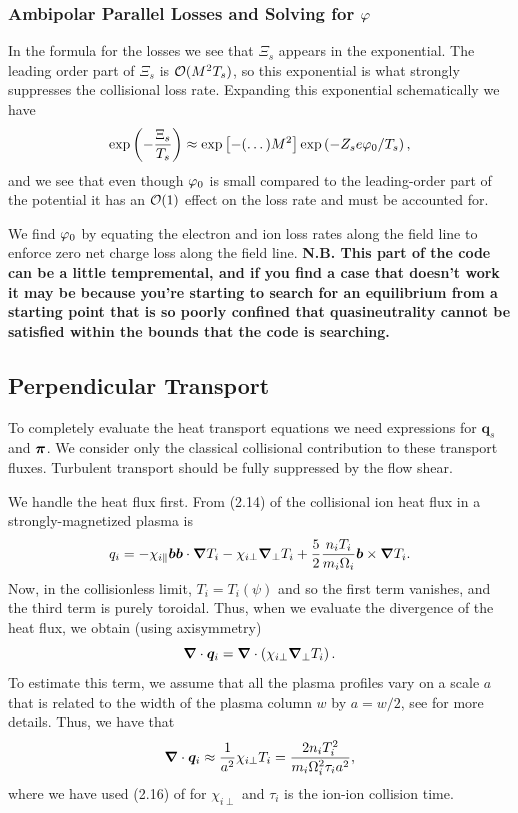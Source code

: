 \documentclass{revtex4}
\providecommand{\pitens}{\tensor{\pi}}
\begin{document}
\subsubsection{Ambipolar Parallel Losses and Solving for $\pot$}
In the formula  for the losses we see that $\Xi_s$ appears in the exponential. The leading order part of $\Xi_s$ is $\Or(M^2 T_s)$, so this exponential is what strongly suppresses the collisional loss rate. Expanding this exponential schematically we have
\begin{equation}
\exp\left( -\frac{\Xi_s}{T_s} \right) \approx \exp\left[ - (\dots) M^2 \right] \exp\left( -Z_s e \pot_0 / T_s \right),
\end{equation}
and we see that even though $\pot_0$ is small compared to the leading-order part of the potential it has an $\Or(1)$ effect on the loss rate and must be accounted for.

We find $\pot_0$ by equating the electron and ion loss rates along the field line to enforce zero net charge loss along the field line. \textbf{N.B. This part of the code can be a little tempremental, and if you find a case that doesn't work it may be because you're starting to search for an equilibrium from a starting point that is so poorly confined that quasineutrality cannot be satisfied within the bounds that the code is searching.}

\subsection{Perpendicular Transport}

To completely evaluate the heat transport equations we need expressions for $\bm{q}_s$ and $\pitens$. 
We consider only the classical collisional contribution to these transport fluxes. Turbulent transport should be fully suppressed by the flow shear.

We handle the heat flux first.
From (2.14) of \citet{braginskii1965tpp} the collisional ion heat flux in a strongly-magnetized plasma is 
\begin{equation}
q_i = -\chi_{i\parallel} \bm{b}\bm{b}\dg T_i - \chi_{i\perp} \grad_\perp T_i + \frac{5}{2} \frac{n_i T_i}{m_i \cycfreq[i]} \bm{b}\times\grad T_i.
\end{equation}
Now, in the collisionless limit, $T_i = T_i(\psi)$ and so the first term vanishes, and the third term is purely toroidal. Thus, when we evaluate the divergence of the heat flux, we obtain (using axisymmetry)
\begin{equation}
\dv\bm{q}_i = \dv\left( \chi_{i\perp} \grad_\perp T_i \right).
\end{equation}
To estimate this term, we assume that all the plasma profiles vary on a scale $a$ that is related to the width of the plasma column $w$ by $a = w/2$, see  for more details. Thus, we have that
\begin{equation}
\dv{\bm{q}_i} \approx \frac{1}{a^2} \chi_{i\perp} T_i = \frac{2 n_i T_i^2}{m_i \cycfreq[i]^2 \tau_i a^2},
\end{equation}
where we have used (2.16) of \citet{braginskii1965tpp} for $\chi_{i\perp}$ and $\tau_i$ is the ion-ion collision time.
\end{document}
